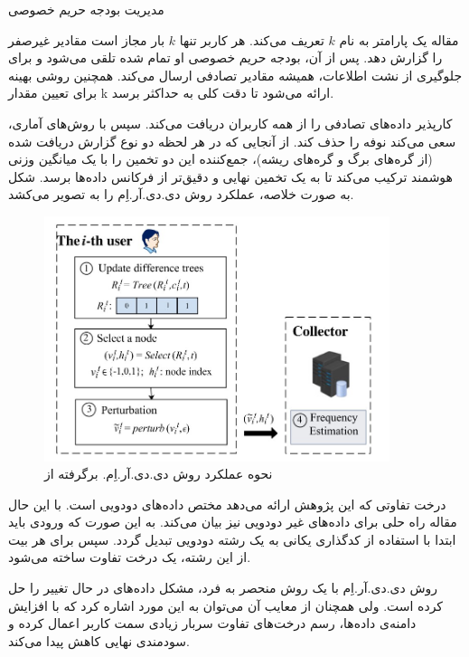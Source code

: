
 مدیریت بودجه حریم خصوصی

مقاله یک پارامتر به نام $k$ تعریف می‌کند. هر کاربر تنها $k$ بار مجاز است مقادیر غیرصفر را گزارش دهد. پس از آن، بودجه حریم خصوصی او تمام شده تلقی می‌شود و برای جلوگیری از نشت اطلاعات، همیشه مقادیر تصادفی ارسال می‌کند. همچنین روشی بهینه برای تعیین مقدار k ارائه می‌شود تا دقت کلی به حداکثر برسد.



کارپذیر داده‌های تصادفی را از همه کاربران دریافت می‌کند. سپس با روش‌های آماری، سعی می‌کند نوفه را حذف کند. از آنجایی که در هر لحظه دو نوع گزارش دریافت شده (از گره‌های برگ و گره‌های ریشه)، جمع‌کننده این دو تخمین را با یک میانگین وزنی هوشمند ترکیب می‌کند تا به یک تخمین نهایی و دقیق‌تر از فرکانس داده‌ها برسد. شکل  به صورت خلاصه، عملکرد روش دی.دی.آر.اِم را به تصویر می‌کشد.


\begin{figure}[h]
    \centering
    \includegraphics[width=0.9\textwidth]{figs/DDRM_overview.jpg}
    \caption{نحوه عملکرد روش دی.دی.آر.اِم. برگرفته از }
    \label{fig:ddrmOverview}
\end{figure}

درخت تفاوتی که این پژوهش ارائه می‌دهد مختص داده‌های دودویی است. با این حال مقاله راه حلی برای داده‌های غیر دودویی نیز بیان می‌کند. به این صورت که ورودی باید ابتدا با استفاده از کدگذاری یکانی به یک رشته دودویی تبدیل گردد. سپس برای هر بیت از این رشته، یک درخت تفاوت ساخته می‌شود.

روش دی.دی.آر.اِم با یک روش منحصر به فرد، مشکل داده‌های در حال تغییر را حل کرده است. ولی همچنان از معایب آن می‌توان به این مورد اشاره کرد که با افزایش دامنه‌ی داده‌ها، رسم درخت‌های تفاوت سربار زیادی سمت کاربر اعمال کرده و سودمندی نهایی کاهش پیدا می‌کند. 

